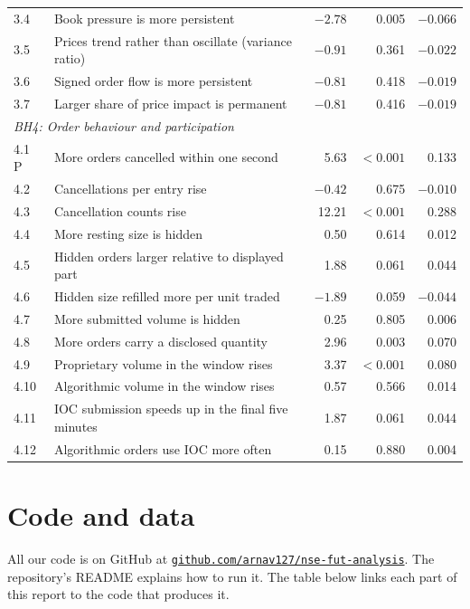 \documentclass[11pt,a4paper]{article}
\begin{document}
\begin{center}
\begin{tabularx}{\textwidth}{lXrrr}
3.4 & Book pressure is more persistent & $-2.78$ & 0.005 & $-0.066$ \\
3.5 & Prices trend rather than oscillate (variance ratio) & $-0.91$ & 0.361 & $-0.022$ \\
3.6 & Signed order flow is more persistent & $-0.81$ & 0.418 & $-0.019$ \\
3.7 & Larger share of price impact is permanent & $-0.81$ & 0.416 & $-0.019$ \\
\multicolumn{5}{l}{\textit{BH4: Order behaviour and participation}} \\
4.1 P & More orders cancelled within one second & 5.63 & $<0.001$ & 0.133 \\
4.2 & Cancellations per entry rise & $-0.42$ & 0.675 & $-0.010$ \\
4.3 & Cancellation counts rise & 12.21 & $<0.001$ & 0.288 \\
4.4 & More resting size is hidden & 0.50 & 0.614 & 0.012 \\
4.5 & Hidden orders larger relative to displayed part & 1.88 & 0.061 & 0.044 \\
4.6 & Hidden size refilled more per unit traded & $-1.89$ & 0.059 & $-0.044$ \\
4.7 & More submitted volume is hidden & 0.25 & 0.805 & 0.006 \\
4.8 & More orders carry a disclosed quantity & 2.96 & 0.003 & 0.070 \\
4.9 & Proprietary volume in the window rises & 3.37 & $<0.001$ & 0.080 \\
4.10 & Algorithmic volume in the window rises & 0.57 & 0.566 & 0.014 \\
4.11 & IOC submission speeds up in the final five minutes & 1.87 & 0.061 & 0.044 \\
4.12 & Algorithmic orders use IOC more often & 0.15 & 0.880 & 0.004 \\
\bottomrule
\end{tabularx}
\end{center}

\section{Code and data}

All our code is on GitHub at
\href{https://github.com/arnav127/nse-fut-analysis}{\texttt{github.com/arnav127/nse-fut-analysis}}.
The repository's README explains how to run it. The table below links each part of this report
to the code that produces it.
\end{document}
